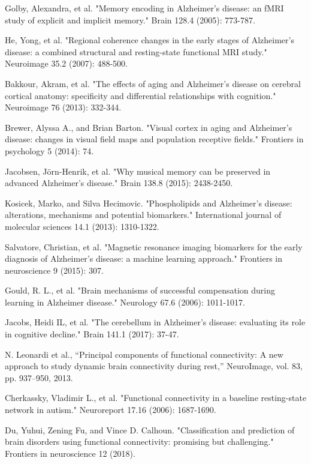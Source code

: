 \documentclass[journal]{IEEEtran}
\begin{document}
\begin{thebibliography}{1}
		Golby, Alexandra, et al. "Memory encoding in Alzheimer's disease: an fMRI study of explicit and implicit memory." Brain 128.4 (2005): 773-787.
		
		He, Yong, et al. "Regional coherence changes in the early stages of Alzheimer’s disease: a combined structural and resting-state functional MRI study." Neuroimage 35.2 (2007): 488-500.
		
		
		
		Bakkour, Akram, et al. "The effects of aging and Alzheimer's disease on cerebral cortical anatomy: specificity and differential relationships with cognition." Neuroimage 76 (2013): 332-344.
		
		Brewer, Alyssa A., and Brian Barton. "Visual cortex in aging and Alzheimer's disease: changes in visual field maps and population receptive fields." Frontiers in psychology 5 (2014): 74.
		
		Jacobsen, Jörn-Henrik, et al. "Why musical memory can be preserved in advanced Alzheimer’s disease." Brain 138.8 (2015): 2438-2450.
		
		Kosicek, Marko, and Silva Hecimovic. "Phospholipids and Alzheimer’s disease: alterations, mechanisms and potential biomarkers." International journal of molecular sciences 14.1 (2013): 1310-1322.
		
		Salvatore, Christian, et al. "Magnetic resonance imaging biomarkers for the early diagnosis of Alzheimer's disease: a machine learning approach." Frontiers in neuroscience 9 (2015): 307.
		
		Gould, R. L., et al. "Brain mechanisms of successful compensation during learning in Alzheimer disease." Neurology 67.6 (2006): 1011-1017.
		
		Jacobs, Heidi IL, et al. "The cerebellum in Alzheimer’s disease: evaluating its role in cognitive decline." Brain 141.1 (2017): 37-47.
		
		N. Leonardi et al., “Principal components of functional connectivity: A
		new approach to study dynamic brain connectivity during rest,” NeuroImage,
		vol. 83, pp. 937–950, 2013.
		
		Cherkassky, Vladimir L., et al. "Functional connectivity in a baseline resting-state network in autism." Neuroreport 17.16 (2006): 1687-1690.
	
		
		
		Du, Yuhui, Zening Fu, and Vince D. Calhoun. "Classification and prediction of brain disorders using functional connectivity: promising but challenging." Frontiers in neuroscience 12 (2018).
		

\end{thebibliography}
\end{document}

